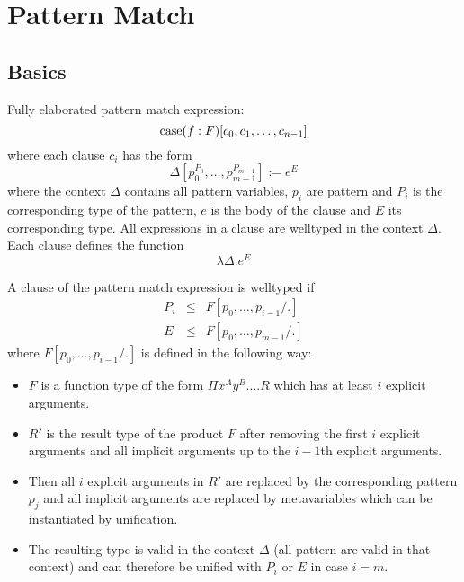 \section{Pattern Match}


\subsection{Basics}

Fully elaborated pattern match expression:
$$
{\text{case}} (f: F)[c_0, c_1, \ldots, c_{n-1}]
$$
where each clause $c_i$ has the form
$$
\Delta [p_0^{P_0}, \ldots, p_{m-1}^{P_{m-1}}] := e^E
$$
where the context $\Delta$ contains all pattern variables, $p_i$ are pattern and
$P_i$ is the corresponding type of the pattern, $e$ is the body of the clause
and $E$ its corresponding type. All expressions in a clause are welltyped in the
context $\Delta$. Each clause defines the function
$$
\lambda \Delta. e^E
$$

A clause of the pattern match expression is welltyped if
$$
\begin{array}{lll}
    P_i &\le& F[p_0,\ldots,p_{i-1} / .]
    \\
    E   &\le& F[p_0,\ldots,p_{m-1} / .]
\end{array}
$$
where $ F[p_0,\ldots,p_{i-1} / .]$ is defined in the following way:
\begin{itemize}
    \item $F$ is a function type of the form $\Pi x^A y^B \ldots . R$ which has
    at least $i$ explicit arguments.

    \item $R'$ is the result type of the product $F$ after removing the first
    $i$ explicit arguments and all implicit arguments up to the $i-1$th explicit
    arguments.

    \item Then all $i$ explicit arguments in $R'$ are replaced by the
    corresponding pattern $p_j$ and all implicit arguments are replaced by
    metavariables which can be instantiated by unification.

    \item The resulting type is valid in the context $\Delta$ (all pattern are
    valid in that context) and can therefore be unified with $P_i$ or $E$ in
    case $i=m$.
\end{itemize}

